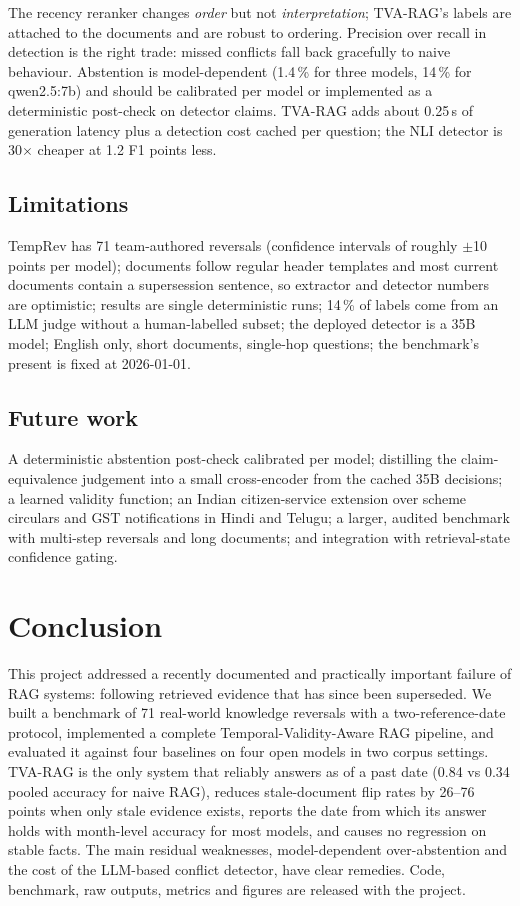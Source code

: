 \documentclass[11pt,a4paper]{report}
\begin{document}
The recency reranker changes \emph{order} but not \emph{interpretation}; TVA-RAG's labels are attached to the documents and are robust to ordering. Precision over recall in detection is the right trade: missed conflicts fall back gracefully to naive behaviour. Abstention is model-dependent (1.4\,\% for three models, 14\,\% for qwen2.5:7b) and should be calibrated per model or implemented as a deterministic post-check on detector claims. TVA-RAG adds about 0.25\,s of generation latency plus a detection cost cached per question; the NLI detector is 30$\times$ cheaper at 1.2 F1 points less.

\section{Limitations}
TempRev has 71 team-authored reversals (confidence intervals of roughly $\pm$10 points per model); documents follow regular header templates and most current documents contain a supersession sentence, so extractor and detector numbers are optimistic; results are single deterministic runs; 14\,\% of labels come from an LLM judge without a human-labelled subset; the deployed detector is a 35B model; English only, short documents, single-hop questions; the benchmark's present is fixed at 2026-01-01.

\section{Future work}
A deterministic abstention post-check calibrated per model; distilling the claim-equivalence judgement into a small cross-encoder from the cached 35B decisions; a learned validity function; an Indian citizen-service extension over scheme circulars and GST notifications in Hindi and Telugu; a larger, audited benchmark with multi-step reversals and long documents; and integration with retrieval-state confidence gating.

\chapter{Conclusion}
This project addressed a recently documented and practically important failure of RAG systems: following retrieved evidence that has since been superseded. We built a benchmark of 71 real-world knowledge reversals with a two-reference-date protocol, implemented a complete Temporal-Validity-Aware RAG pipeline, and evaluated it against four baselines on four open models in two corpus settings. TVA-RAG is the only system that reliably answers as of a past date (0.84 vs 0.34 pooled accuracy for naive RAG), reduces stale-document flip rates by 26--76 points when only stale evidence exists, reports the date from which its answer holds with month-level accuracy for most models, and causes no regression on stable facts. The main residual weaknesses, model-dependent over-abstention and the cost of the LLM-based conflict detector, have clear remedies. Code, benchmark, raw outputs, metrics and figures are released with the project.
\end{document}
